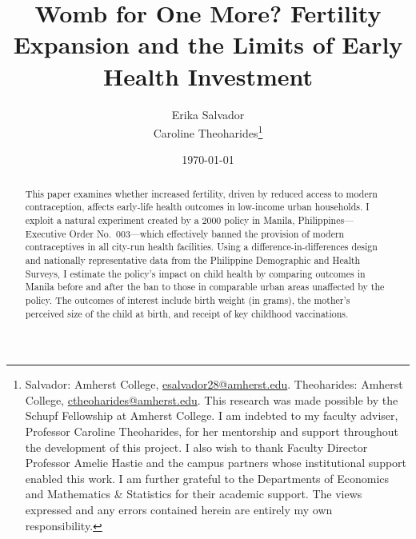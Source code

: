 \documentclass[]{AEA}
\begin{document}
\title{Womb for One More? Fertility Expansion and the Limits of Early
Health Investment}


\author{
  Erika Salvador\\
  Caroline Theoharides\thanks{
  Salvador: Amherst
College, \href{mailto:esalvador28@amherst.edu}{esalvador28@amherst.edu}.
  Theoharides: Amherst
College, \href{mailto:ctheoharides@amherst.edu}{ctheoharides@amherst.edu}.
  This research was made possible by the Schupf Fellowship at Amherst
  College. I am indebted to my faculty adviser, Professor Caroline
  Theoharides, for her mentorship and support throughout the development
  of this project. I also wish to thank Faculty Director Professor
  Amelie Hastie and the campus partners whose institutional support
  enabled this work. I am further grateful to the Departments of
  Economics and Mathematics \& Statistics for their academic support.
  The views expressed and any errors contained herein are entirely my
  own responsibility.
}
}

\date{\today}
\pubVolume{}
\pubIssue{}

\begin{abstract}
This paper examines whether increased fertility, driven by reduced
access to modern contraception, affects early-life health outcomes in
low-income urban households. I exploit a natural experiment created by a
2000 policy in Manila, Philippines---Executive Order No.~003---which
effectively banned the provision of modern contraceptives in all
city-run health facilities. Using a difference-in-differences design and
nationally representative data from the Philippine Demographic and
Health Surveys, I estimate the policy's impact on child health by
comparing outcomes in Manila before and after the ban to those in
comparable urban areas unaffected by the policy. The outcomes of
interest include birth weight (in grams), the mother's perceived size of
the child at birth, and receipt of key childhood vaccinations.
\end{abstract}


\maketitle
\end{document}
